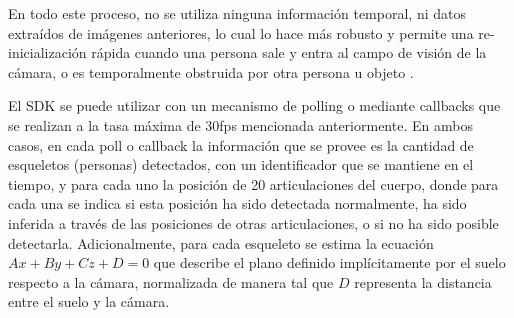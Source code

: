 En todo este proceso, no se utiliza ninguna información temporal, ni datos extraídos de imágenes anteriores, lo cual lo hace más robusto y permite una re-inicialización rápida cuando una persona sale y entra al campo de visión de la cámara, o es temporalmente obstruida por otra persona u objeto \cite{Shotton2011}.  



El SDK se puede utilizar con un mecanismo de polling o mediante callbacks que se realizan a la tasa máxima de 30fps mencionada anteriormente. En ambos casos, en cada poll o callback la información que se provee es la cantidad de esqueletos (personas) detectados, con un identificador que se mantiene en el tiempo, y para cada uno la posición de 20 articulaciones del cuerpo, donde para cada una se indica si esta posición ha sido detectada normalmente, ha sido inferida a través de las posiciones de otras articulaciones, o si no ha sido posible detectarla. Adicionalmente, para cada esqueleto se estima la ecuación $Ax+By+Cz+D=0$ que describe el plano definido implícitamente por el suelo respecto a la cámara, normalizada de manera tal que $D$ representa la distancia entre el suelo y la cámara.
